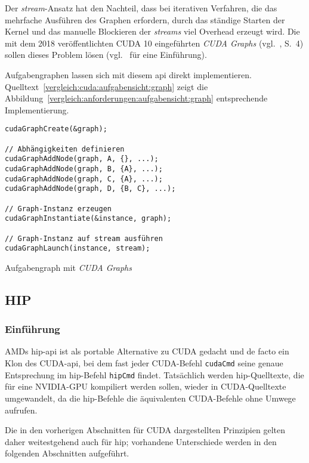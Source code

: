 Der \textit{stream}-Ansatz hat den Nachteil, dass bei iterativen Verfahren, die
das mehrfache Ausführen des Graphen erfordern, durch das ständige Starten der
Kernel und das manuelle Blockieren der \textit{streams} viel Overhead erzeugt
wird. Die mit dem 2018 veröffentlichten CUDA 10 eingeführten
\textit{CUDA Graphs} (vgl.~\cite{cuda10rel}, S.\ 4) sollen dieses Problem lösen
(vgl.~\cite{ramarao2018} für eine Einführung).

Aufgabengraphen lassen sich mit diesem \gls{api} direkt implementieren.
Quelltext~\ref{vergleich:cuda:aufgabensicht:graph} zeigt die
Abbildung~\ref{vergleich:anforderungen:aufgabensicht:graph} entsprechende
Implementierung. 

\begin{code}
    \begin{verbatim}
cudaGraphCreate(&graph);

// Abhängigkeiten definieren
cudaGraphAddNode(graph, A, {}, ...);
cudaGraphAddNode(graph, B, {A}, ...);
cudaGraphAddNode(graph, C, {A}, ...);
cudaGraphAddNode(graph, D, {B, C}, ...);

// Graph-Instanz erzeugen
cudaGraphInstantiate(&instance, graph);

// Graph-Instanz auf stream ausführen
cudaGraphLaunch(instance, stream);
    \end{verbatim}
    \caption{Aufgabengraph mit \textit{CUDA Graphs}}
    \label{vergleich:cuda:aufgabensicht:graph}
\end{code}

\subsection{HIP}

\subsubsection{Einführung}

AMDs \gls{hip}-\gls{api} ist als portable Alternative zu CUDA gedacht und de
facto ein Klon des CUDA-\gls{api}, bei dem fast jeder CUDA-Befehl
\texttt{cudaCmd} seine genaue Entsprechung im \gls{hip}-Befehl \texttt{hipCmd}
findet. Tatsächlich werden \gls{hip}-Quelltexte, die für eine NVIDIA-GPU
kompiliert werden sollen, wieder in CUDA-Quelltexte umgewandelt, da die
\gls{hip}-Befehle die äquivalenten CUDA-Befehle ohne Umwege aufrufen.

Die in den vorherigen Abschnitten für CUDA dargestellten Prinzipien gelten daher
weitestgehend auch für \gls{hip}; vorhandene Unterschiede werden in den
folgenden Abschnitten aufgeführt.

